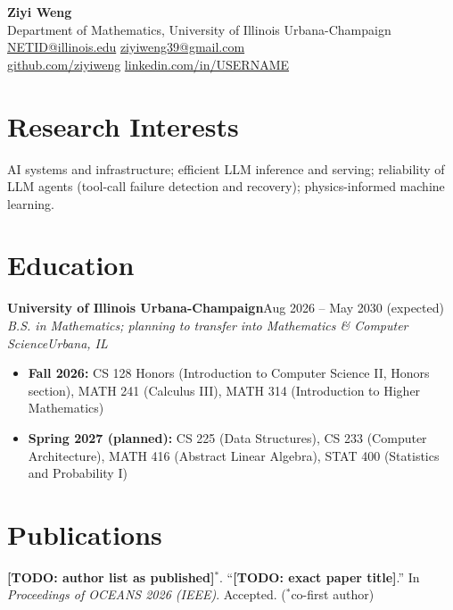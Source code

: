 \documentclass[11pt,letterpaper]{article}
\newcommand{\entry}[4]{%
  \par\vspace{3pt}\noindent
  \textbf{#1}\hfill #2\\
  \textit{#3}\hfill\textit{#4}\par}
\newcommand{\sep}{\quad\textperiodcentered\quad}
\newcommand{\todo}[1]{\textbf{[TODO: #1]}}
\begin{document}
\begin{center}
  {\LARGE\bfseries Ziyi Weng}\\[4pt]
  Department of Mathematics, University of Illinois Urbana-Champaign\\
  \href{mailto:NETID@illinois.edu}{NETID@illinois.edu}\sep
  \href{mailto:ziyiweng39@gmail.com}{ziyiweng39@gmail.com}\\
  \href{https://github.com/ziyiweng}{github.com/ziyiweng}\sep
  \href{https://linkedin.com/in/USERNAME}{linkedin.com/in/USERNAME}
\end{center}

\section*{Research Interests}
AI systems and infrastructure; efficient LLM inference and serving; reliability of LLM agents
(tool-call failure detection and recovery); physics-informed machine learning.

\section*{Education}
\entry{University of Illinois Urbana-Champaign}{Aug 2026 -- May 2030 (expected)}
      {B.S. in Mathematics; planning to transfer into Mathematics \& Computer Science}{Urbana, IL}
\begin{itemize}
  \item \textbf{Fall 2026:} CS 128 Honors (Introduction to Computer Science II, Honors section),
        MATH 241 (Calculus III), MATH 314 (Introduction to Higher Mathematics)
  \item \textbf{Spring 2027 (planned):} CS 225 (Data Structures), CS 233 (Computer Architecture),
        MATH 416 (Abstract Linear Algebra), STAT 400 (Statistics and Probability I)
\end{itemize}

\section*{Publications}
\begin{enumerate}[label={[\arabic*]},leftmargin=2em,itemsep=2pt,topsep=2pt]
  \item \todo{author list as published}$^{*}$. ``\todo{exact paper title}.''
        In \textit{Proceedings of OCEANS 2026 (IEEE)}. Accepted. ($^{*}$co-first author)
\end{enumerate}
\end{document}
